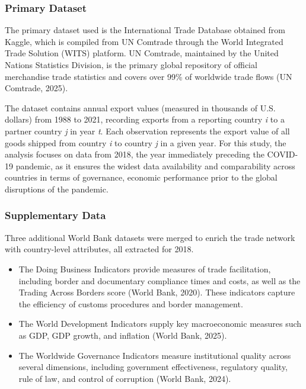 \documentclass[
]{article}
\begin{document}
\subsubsection{Primary Dataset}\label{primary-dataset}

The primary dataset used is the International Trade Database obtained
from Kaggle, which is compiled from UN Comtrade through the World
Integrated Trade Solution (WITS) platform. UN Comtrade, maintained by
the United Nations Statistics Division, is the primary global repository
of official merchandise trade statistics and covers over 99\% of
worldwide trade flows (UN Comtrade, 2025).

The dataset contains annual export values (measured in thousands of U.S.
dollars) from 1988 to 2021, recording exports from a reporting country
\emph{i} to a partner country \emph{j} in year \emph{t}. Each
observation represents the export value of all goods shipped from
country \emph{i} to country \emph{j} in a given year. For this study,
the analysis focuses on data from 2018, the year immediately preceding
the COVID-19 pandemic, as it ensures the widest data availability and
comparability across countries in terms of governance, economic
performance prior to the global disruptions of the pandemic.

\subsubsection{Supplementary Data}\label{supplementary-data}

Three additional World Bank datasets were merged to enrich the trade
network with country-level attributes, all extracted for 2018.

\begin{itemize}
\item
  The Doing Business Indicators provide measures of trade facilitation,
  including border and documentary compliance times and costs, as well
  as the Trading Across Borders score (World Bank, 2020). These
  indicators capture the efficiency of customs procedures and border
  management.
\item
  The World Development Indicators supply key macroeconomic measures
  such as GDP, GDP growth, and inflation (World Bank, 2025).
\item
  The Worldwide Governance Indicators measure institutional quality
  across several dimensions, including government effectiveness,
  regulatory quality, rule of law, and control of corruption (World
  Bank, 2024).
\end{itemize}
\end{document}
